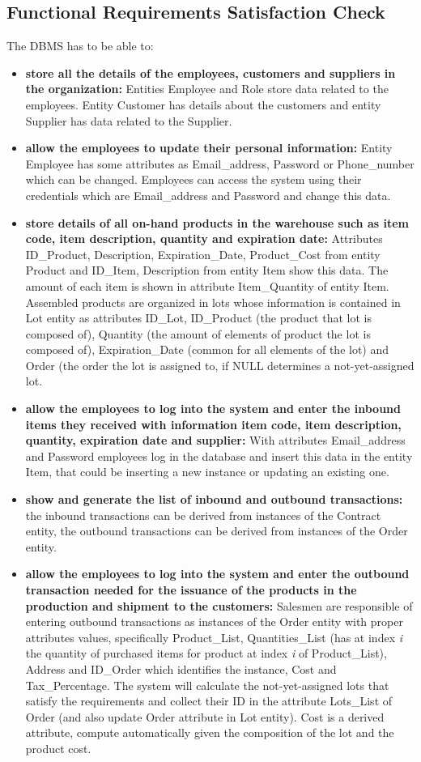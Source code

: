 \subsection{Functional Requirements Satisfaction Check}

The DBMS has to be able to:
\begin{itemize}
	\item \textbf{store all the details of the employees, customers and suppliers in the organization:} Entities Employee and Role store data related to the employees. Entity Customer has details about the customers and entity Supplier has data related to the Supplier.
	\item \textbf{allow the employees to update their personal information:} Entity Employee has some attributes as Email\_address, Password or Phone\_number which can be changed. Employees can access the system using their credentials which are Email\_address and Password and change this data.
	\item \textbf{store details of all on-hand products in the warehouse such as item code, item description, quantity and expiration date:} Attributes ID\_Product, Description, Expiration\_Date, Product\_Cost from entity Product and ID\_Item, Description from entity Item show this data. The amount of each item is shown in attribute Item\_Quantity of entity Item. Assembled products are organized in lots whose information is contained in Lot entity as attributes ID\_Lot, ID\_Product (the product that lot is composed of), Quantity (the amount of elements of product the lot is composed of), Expiration\_Date (common for all elements of the lot) and Order (the order the lot is assigned to, if NULL determines a not-yet-assigned lot.  
	\item \textbf{allow the employees to log into the system and enter the inbound items they received with information item code, item description, quantity, expiration date and supplier:} With attributes Email\_address and Password employees log in the database and insert this data in the entity Item, that could be inserting a new instance or updating an existing one.
	\item \textbf{show and generate the list of inbound and outbound transactions:} the inbound transactions can be derived from instances of the Contract entity, the outbound transactions can be derived from instances of the Order entity.
	\item \textbf{allow the employees to log into the system and enter the outbound transaction needed for the issuance of the products in the production and shipment to the customers:} Salesmen are responsible of entering outbound transactions as instances of the Order entity with proper attributes values, specifically Product\_List, Quantities\_List (has at index \textit{i} the quantity of purchased items for product at index \textit{i} of Product\_List), Address and ID\_Order which identifies the instance, Cost and Tax\_Percentage. The system will calculate the not-yet-assigned lots that satisfy the requirements and collect their ID in the attribute Lots\_List of Order (and also update Order attribute in Lot entity). Cost is a derived attribute, compute automatically given the composition of the lot and the product cost.

\end{itemize}
